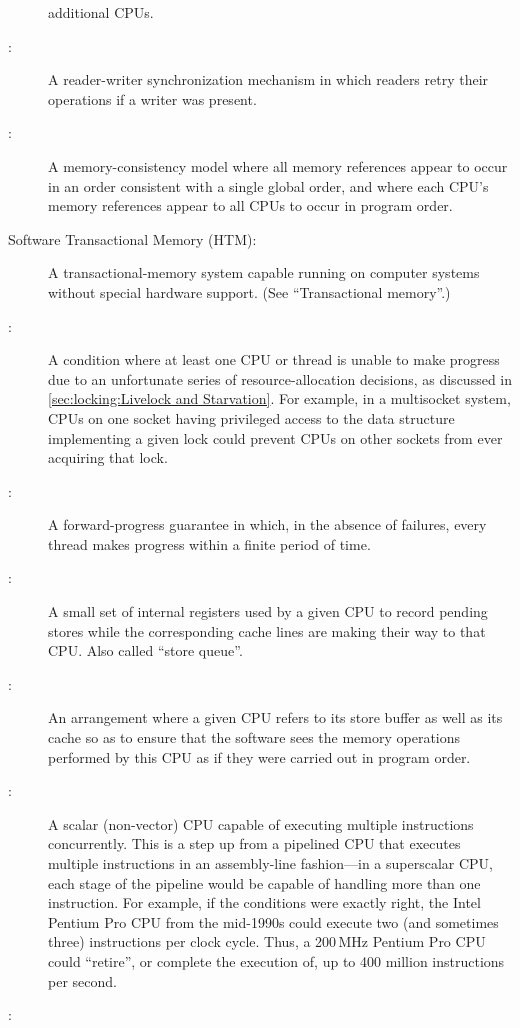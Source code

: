 \begin{description}
	additional CPUs.
\item[\IXGh{Sequence}{Lock}:]
	A reader-writer synchronization mechanism in which readers
	retry their operations if a writer was present.
\item[\IXGh{Sequential}{Consistency}:]
	A memory-consistency model where all memory references appear to occur
	in an order consistent with
	a single global order, and where each CPU's memory references
	appear to all CPUs to occur in program order.
\item[Software Transactional Memory (HTM):]
	A transactional-memory system capable running on computer systems
	without special hardware support.
	(See ``Transactional memory''.)
\item[\IXG{Starvation}:]
	A condition where at least one CPU or thread is unable to make
	progress due to an unfortunate series of resource-allocation
	decisions, as discussed in
	\cref{sec:locking:Livelock and Starvation}.
	For example, in a multisocket system, CPUs on one socket having
	privileged access to the data structure implementing a given lock
	could prevent CPUs on other sockets from ever acquiring that lock.
\item[\IXG{Starvation Free}:]
	A forward-progress guarantee in which, in the absence of
	failures, every thread makes progress within a finite
	period of time.
\item[\IXG{Store Buffer}:]
	A small set of internal registers used by a given CPU
	to record pending stores
	while the corresponding cache lines are making their
	way to that CPU\@.
	Also called ``store queue''.
\item[\IXG{Store Forwarding}:]
	An arrangement where a given CPU refers to its store buffer
	as well as its cache so as to ensure that the software sees
	the memory operations performed by this CPU as if they
	were carried out in program order.
\item[\IXGr{Superscalar CPU}:]
	A scalar (non-vector) CPU capable of executing multiple instructions
	concurrently.
	This is a step up from a pipelined CPU that executes multiple
	instructions in an assembly-line fashion---in a superscalar
	CPU, each stage of the pipeline would be capable of handling
	more than one instruction.
	For example, if the conditions were exactly right,
	the Intel Pentium Pro CPU from the mid-1990s could
	execute two (and sometimes three) instructions per clock cycle.
	Thus, a 200\,MHz Pentium Pro CPU could ``retire'', or complete the
	execution of, up to 400 million instructions per second.
\item[\IXG{Synchronization}:]

\end{description}
